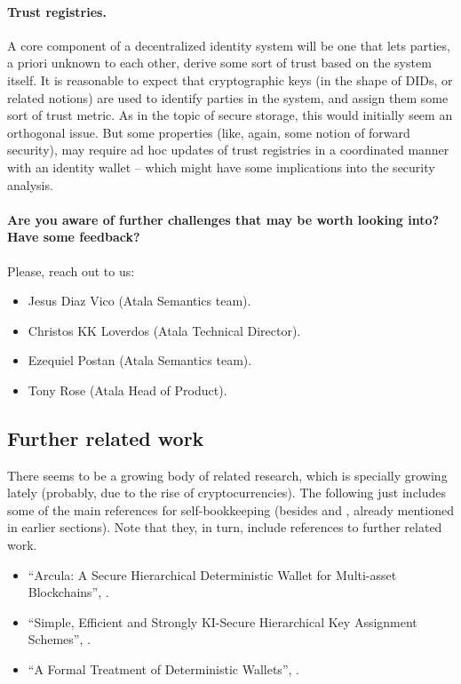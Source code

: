 \paragraph{Trust registries.} %
A core component of a decentralized identity system will be one that lets
parties, a priori unknown to each other, derive some sort of trust based on the
system itself. It is reasonable to expect that cryptographic keys (in the
shape of DIDs, or related notions) are used to identify parties in the system,
and assign them some sort of trust metric. As in the topic of secure storage,
this would initially seem an orthogonal issue. But some properties (like, again,
some notion of forward security), may require ad hoc updates of trust registries
in a coordinated manner with an identity wallet -- which might have some
implications into the security analysis.

\paragraph{Are you aware of further challenges that may be worth
  looking into? Have some feedback?} Please, reach out to us:

\begin{itemize}
\item Jesus Diaz Vico (Atala Semantics team).
\item Christos KK Loverdos (Atala Technical Director).
\item Ezequiel Postan (Atala Semantics team).
\item Tony Rose (Atala Head of Product).
\end{itemize}

  
\subsection{Further related work}

There seems to be a growing body of related research, which is specially
growing lately (probably, due to the rise of cryptocurrencies). The following
just includes some of the main references for self-bookkeeping (besides
\cite{kkl20} and \cite{def+21}, already mentioned in earlier sections). Note
that they, in turn, include references to further related work.

\begin{itemize}
\item ``Arcula: A Secure Hierarchical Deterministic Wallet for Multi-asset
  Blockchains'', \cite{lfa20}.
\item ``Simple, Efficient and Strongly KI-Secure Hierarchical Key Assignment
  Schemes'', \cite{fpp13}.
\item ``A Formal Treatment of Deterministic Wallets'', \cite{dfl19}.
\end{itemize}


